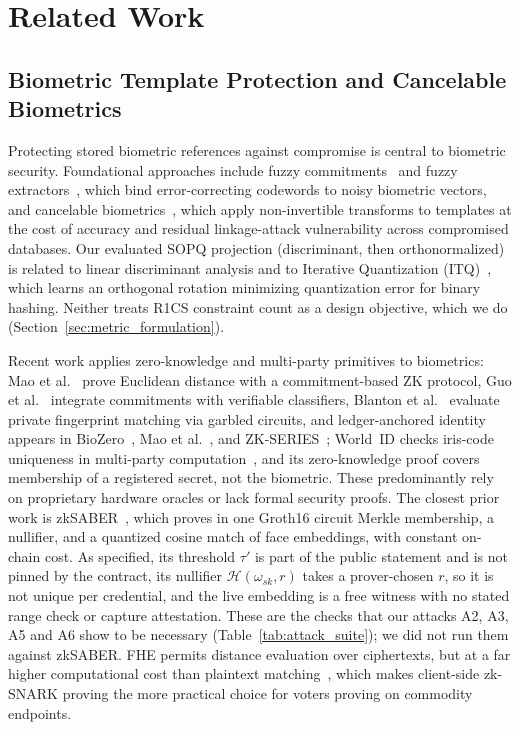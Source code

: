 \documentclass[10pt,letterpaper,journal]{IEEEtran}
\begin{document}
\begin{enumerate}[leftmargin=*,noitemsep,topsep=1pt,parsep=0pt]
\end{enumerate}

\section{Related Work}
\label{sec:related}


\subsection{Biometric Template Protection and Cancelable Biometrics}
\label{subsec:rel_biometric}
Protecting stored biometric references against compromise is central to biometric security. Foundational approaches include fuzzy commitments~\cite{JuelsWattenberg1999} and fuzzy extractors~\cite{Dodis2004}, which bind error-correcting codewords to noisy biometric vectors, and cancelable biometrics~\cite{Rathgeb2011}, which apply non-invertible transforms to templates at the cost of accuracy and residual linkage-attack vulnerability across compromised databases.
Our evaluated SOPQ projection (discriminant, then orthonormalized) is related to linear discriminant analysis and to Iterative Quantization (ITQ)~\cite{Gong2013}, which learns an orthogonal rotation minimizing quantization error for binary hashing. Neither treats R1CS constraint count as a design objective, which we do (Section~\ref{sec:metric_formulation}).

Recent work applies zero-knowledge and multi-party primitives to biometrics: Mao et al.~\cite{Mao2023} prove Euclidean distance with a commitment-based ZK protocol, Guo et al.~\cite{Guo2024} integrate commitments with verifiable classifiers, Blanton et al.~\cite{Blanton2024} evaluate private fingerprint matching via garbled circuits, and ledger-anchored identity appears in BioZero~\cite{Lai2024}, Mao et al.~\cite{Mao2025}, and ZK-SERIES~\cite{ZKSeries2025}; World~ID checks iris-code uniqueness in multi-party computation~\cite{WorldID2024}, and its zero-knowledge proof covers membership of a registered secret, not the biometric. These predominantly rely on proprietary hardware oracles or lack formal security proofs.
The closest prior work is zkSABER~\cite{zkSABER2025}, which proves in one Groth16 circuit Merkle membership, a nullifier, and a quantized cosine match of face embeddings, with constant on-chain cost. As specified, its threshold $\tau'$ is part of the public statement and is not pinned by the contract, its nullifier $\mathcal{H}(\omega_{sk}, r)$ takes a prover-chosen $r$, so it is not unique per credential, and the live embedding is a free witness with no stated range check or capture attestation. These are the checks that our attacks A2, A3, A5 and A6 show to be necessary (Table~\ref{tab:attack_suite}); we did not run them against zkSABER. FHE permits distance evaluation over ciphertexts, but at a far higher computational cost than plaintext matching~\cite{Karakosta2025}, which makes client-side zk-SNARK proving the more practical choice for voters proving on commodity endpoints.
\end{document}
